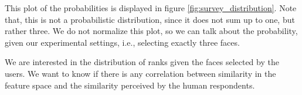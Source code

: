 This plot of the probabilities is displayed in figure \ref{fig:survey_distribution}. Note that, this is not a probabilistic distribution, since it does not sum up to one, but rather three. We do not normalize this plot, so we can talk about the probability, given our experimental settings, i.e., selecting exactly three faces.



We are interested in the distribution of ranks given the faces selected by the users. We want to know if there is any correlation between similarity in the feature space and the similarity perceived by the human respondents. 



